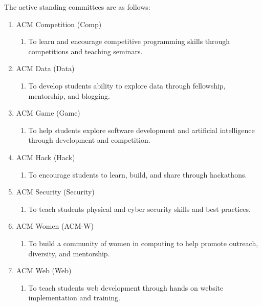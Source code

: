 The active standing committees are as follows:
\begin{enumerate}[nolistsep]
  \item ACM Competition (Comp)
    \begin{enumerate}
      \item To learn and encourage competitive programming skills through
      competitions and teaching seminars.
    \end{enumerate}
  \item ACM Data (Data)
    \begin{enumerate}
      \item To develop students ability to explore data through fellowship,
        mentorship, and blogging.
    \end{enumerate}
  \item ACM Game (Game)
    \begin{enumerate}
      \item To help students explore software development and artificial
        intelligence through development and competition.
    \end{enumerate}
  \item ACM Hack (Hack)
    \begin{enumerate}
      \item To encourage students to learn, build, and share through
        hackathons.
    \end{enumerate}
  \item ACM Security (Security)
    \begin{enumerate}
      \item To teach students physical and cyber security skills and best
        practices.
    \end{enumerate}
  \item ACM Women (ACM-W)
    \begin{enumerate}
      \item To build a community of women in computing to help promote
        outreach, diversity, and mentorship.
    \end{enumerate}
  \item ACM Web (Web)
    \begin{enumerate}
      \item To teach students web development through hands on website
        implementation and training.
    \end{enumerate}
\end{enumerate}

